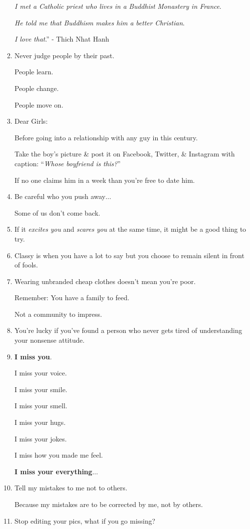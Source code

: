 \documentclass{article}
\begin{document}
\begin{enumerate}
	\textit{I met a Catholic priest who lives in a Buddhist Monastery in France}.
	
	\textit{He told me that Buddhism makes him a better Christian}.
	
	\textit{I love that}.'' - Thich Nhat Hanh
	\item Never judge people by their past.
	
	People learn.
	
	People change.
	
	People move on.
	\item Dear Girls:
	
	Before going into a relationship with any guy in this century.
	
	Take the boy's picture \& post it on Facebook, Twitter, \& Instagram with caption: ``\textit{Whose boyfriend is this?}''
	
	If no one claims him in a week than you're free to date him.
	\item Be careful who you push away$\ldots$
	
	Some of us don't come back.
	\item If it \textit{excites you} and \textit{scares you} at the same time, it might be a good thing to try.
	\item Classy is when you have a lot to say but you choose to remain silent in front of fools.
	\item Wearing unbranded cheap clothes doesn't mean you're poor.
	
	Remember: You have a family to feed.
	
	Not a community to impress.
	\item You're lucky if you've found a person who never gets tired of understanding your nonsense attitude.
	\item \textbf{I miss you}.
	
	I miss your voice.
	
	I miss your smile.
	
	I miss your smell.
	
	I miss your hugs.
	
	I miss your jokes.
	
	I miss how you made me feel.
	
	\textbf{I miss your everything}$\ldots$
	\item Tell my mistakes to me not to others.
	
	Because my mistakes are to be corrected by me, not by others.
	\item Stop editing your pics, what if you go missing?
	

\end{enumerate}
\end{document}
